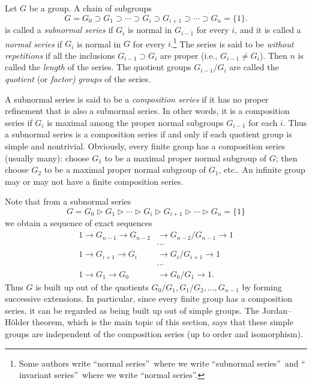 \documentclass[a4paper,11pt,final,openany]{memoir}%
\theoremstyle{nonumberplain}
\begin{document}
Let $G$ be a group. A chain of subgroups
\[
G=G_{0}\supset G_{1}\supset\cdots\supset G_{i}\supset G_{i+1}\supset
\cdots\supset G_{n}=\{1\}.
\]
is called a \emph{subnormal series}%
if $G_{i}$ is normal in $G_{i-1}$ for every $i$, and it is called a
\emph{normal series}%
if $G_{i}$ is normal in $G$ for every $i$.\footnote{Some authors write
\textquotedblleft normal series\textquotedblright\ where we write
\textquotedblleft subnormal series\textquotedblright\ and \textquotedblleft
invariant series\textquotedblright\ where we write \textquotedblleft normal
series\textquotedblright.} The series is said to be \emph{without repetitions}%
if all the inclusions $G_{i-1}\supset G_{i}$ are proper (i.e., $G_{i-1}\neq
G_{i}$). Then $n$ is called the \emph{length\/}%
of the series. The quotient groups $G_{i-1}/G_{i}$ are called the
\emph{quotient\/} (or \emph{factor)\/} \emph{groups}%
of the series.

A subnormal series is said to be a \emph{composition series\/}%
if it has no proper refinement that is also a subnormal series. In other
words, it is a composition series if $G_{i}$ is maximal among the proper
normal subgroups $G_{i-1}$ for each $i$. Thus a subnormal series is a
composition series if and only if each quotient group is simple and
nontrivial. Obviously, every finite group has a composition series (usually
many): choose $G_{1}$ to be a maximal proper normal subgroup of $G$; then
choose $G_{2}$ to be a maximal proper normal subgroup of $G_{1}$, etc.. An
infinite group may or may not have a finite composition series.

Note that from a subnormal series
\[
G=G_{0}\triangleright G_{1}\triangleright\cdots\triangleright G_{i}%
\triangleright G_{i+1}\triangleright\cdots\triangleright G_{n}=\{1\}
\]
we obtain a sequence of exact sequences%
\begin{align*}
1\rightarrow G_{n-1}\rightarrow G_{n-2}  &  \rightarrow G_{n-2}/G_{n-1}%
\rightarrow1\\
&  \cdots\\
1\rightarrow G_{i+1}\rightarrow G_{i}  &  \rightarrow G_{i}/G_{i+1}%
\rightarrow1\\
&  \cdots\\
1\rightarrow G_{1}\rightarrow G_{0}  &  \rightarrow G_{0}/G_{1}\rightarrow1.
\end{align*}
Thus $G$ is built up out of the quotients $G_{0}/G_{1},G_{1}/G_{2}%
,\ldots,G_{n-1}$ by forming successive extensions. In particular, since every
finite group has a composition series, it can be regarded as being built up
out of simple groups. The Jordan--H\"{o}lder theorem, which is the main topic
of this section, says that these simple groups are independent of the
composition series (up to order and isomorphism).
\end{document}
